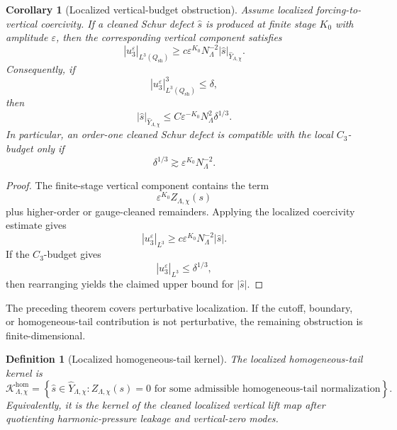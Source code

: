 \documentclass[11pt]{article}
\numberwithin{equation}{section}
\newtheorem{corollary}[theorem]{Corollary}
\newtheorem{definition}[theorem]{Definition}
\begin{document}
\begin{corollary}[Localized vertical-budget obstruction]
Assume localized forcing-to-vertical coercivity. If a cleaned Schur defect \(\widehat s\) is produced at finite stage \(K_0\) with amplitude \(\varepsilon\), then the corresponding vertical component satisfies
\begin{equation}
|u_3^\varepsilon|_{L^3(Q_{\mathrm{sh}})}
\ge
c\varepsilon^{K_0}N_\Lambda^{-2}
|\widehat s|_{\widehat Y_{\Lambda,\chi}}.
\label{eq:tag-10-218}
\end{equation}
Consequently, if
\[
|u_3^\varepsilon|_{L^3(Q_{\mathrm{sh}})}^3\le \delta,
\]
then
\begin{equation}
|\widehat s|_{\widehat Y_{\Lambda,\chi}}
\le
C\varepsilon^{-K_0}N_\Lambda^2\delta^{1/3}.
\label{eq:tag-10-219}
\end{equation}
In particular, an order-one cleaned Schur defect is compatible with the local \(C_3\)-budget only if
\begin{equation}
\delta^{1/3}
\gtrsim
\varepsilon^{K_0}N_\Lambda^{-2}.
\label{eq:tag-10-220}
\end{equation}
\end{corollary}

\begin{proof}
The finite-stage vertical component contains the term
\[
\varepsilon^{K_0}Z_{\Lambda,\chi}(s)
\]
plus higher-order or gauge-cleaned remainders. Applying the localized coercivity estimate gives
\[
|u_3^\varepsilon|_{L^3}
\ge
c\varepsilon^{K_0}N_\Lambda^{-2}|\widehat s|.
\]
If the \(C_3\)-budget gives
\[
|u_3^\varepsilon|_{L^3}\le\delta^{1/3},
\]
then rearranging yields the claimed upper bound for \(|\widehat s|\).
\end{proof}

The preceding theorem covers perturbative localization. If the cutoff, boundary, or homogeneous-tail contribution is not perturbative, the remaining obstruction is finite-dimensional.

\begin{definition}[Localized homogeneous-tail kernel]
The localized homogeneous-tail kernel is
\begin{equation}
\mathcal K_{\Lambda,\chi}^{\mathrm{hom}} =
\left\{
\widehat s\in\widehat Y_{\Lambda,\chi}:
Z_{\Lambda,\chi}(s)=0
\text{ for some admissible homogeneous-tail normalization}
\right\}.
\label{eq:tag-10-221}
\end{equation}
Equivalently, it is the kernel of the cleaned localized vertical lift map after quotienting harmonic-pressure leakage and vertical-zero modes.
\end{definition}
\end{document}
